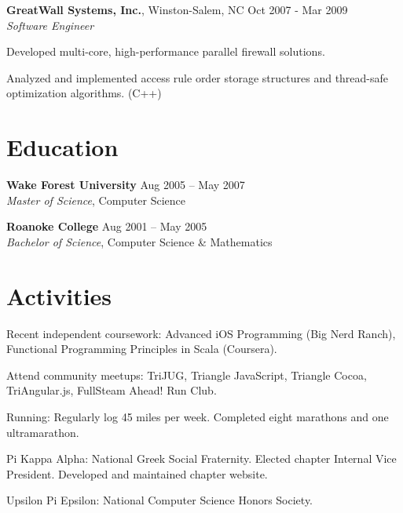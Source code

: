 \documentclass[margin,line]{resume}
\begin{document}
\begin{resume}
  \textbf{GreatWall Systems, Inc.}, Winston-Salem, NC \hfill Oct 2007 - Mar 2009\vspace{1mm}\\
  \textsl{Software Engineer}\\
  \vspace{-3mm}
  \begin{list2}
\item Developed multi-core, high-performance parallel firewall solutions.
\item Analyzed and implemented access rule order storage structures and thread-safe optimization algorithms. (C++)
  \end{list2}


  \section{\mysidestyle \textcolor{mySideColor}{Education}}

  \textbf{Wake Forest University}\vspace{2mm} \hfill Aug 2005 -- May 2007\\
  \textsl{Master of Science}, Computer Science\vspace{-1mm}

  \textbf{Roanoke College}\vspace{2mm} \hfill Aug 2001 -- May 2005\\
  \textsl{Bachelor of Science}, Computer Science \& Mathematics\vspace{-1mm}


  \section{\mysidestyle \textcolor{mySideColor}{Activities}}

Recent independent coursework: Advanced iOS Programming (Big Nerd Ranch), Functional Programming Principles in Scala (Coursera).

Attend community meetups: TriJUG, Triangle JavaScript, Triangle Cocoa, TriAngular.js, FullSteam Ahead! Run Club.

Running: Regularly log 45 miles per week. Completed eight marathons and one ultramarathon.\vspace{-2mm}

Pi Kappa Alpha: National Greek Social Fraternity. Elected chapter Internal Vice President. Developed and maintained chapter website.\vspace{-2mm}

Upsilon Pi Epsilon: National Computer Science Honors Society.\vspace{-2mm}

\end{resume}
\end{document}
